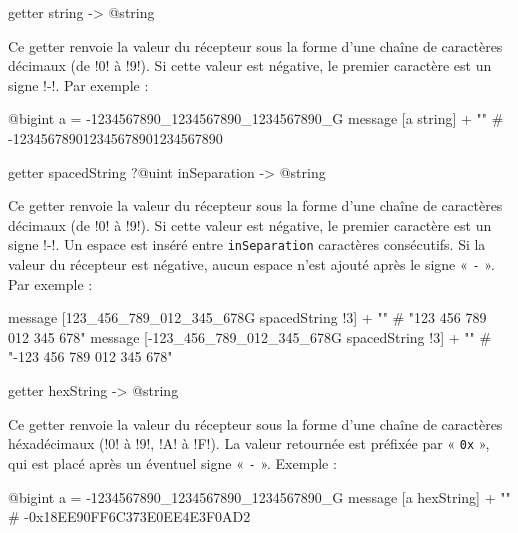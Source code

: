 
\begin{galgasbox}
getter string -> @string
\end{galgasbox}

Ce getter renvoie la valeur du récepteur sous la forme d'une chaîne de caractères décimaux (de \ggs!0! à \ggs!9!). Si cette valeur est négative, le premier caractère est un signe \ggs!-!. Par exemple :

\begin{galgas}
@bigint a = -1234567890_1234567890_1234567890_G
message [a string] + "\n" # -123456789012345678901234567890
\end{galgas}




\begin{galgasbox}
getter spacedString ?@uint inSeparation -> @string
\end{galgasbox}

Ce getter renvoie la valeur du récepteur sous la forme d'une chaîne de caractères décimaux (de \ggs!0! à \ggs!9!). Si cette valeur est négative, le premier caractère est un signe \ggs!-!. Un espace est inséré entre \texttt{inSeparation} caractères consécutifs. Si la valeur du récepteur est négative, aucun espace n'est ajouté après le signe « \texttt{-} ». Par exemple :

\begin{galgas}
message [123_456_789_012_345_678G spacedString !3] + "\n"
# "123 456 789 012 345 678"
message [-123_456_789_012_345_678G spacedString !3] + "\n"
# "-123 456 789 012 345 678"
\end{galgas}






\begin{galgasbox}
getter hexString -> @string
\end{galgasbox}

Ce getter renvoie la valeur du récepteur sous la forme d'une chaîne de caractères héxadécimaux (\ggs!0! à \ggs!9!, \ggs!A! à \ggs!F!). La valeur retournée est préfixée par « \texttt{0x} », qui est placé après un éventuel signe « \texttt{-} ». Exemple :

\begin{galgas}
@bigint a = -1234567890_1234567890_1234567890_G
message [a hexString] + "\n" # -0x18EE90FF6C373E0EE4E3F0AD2
\end{galgas}








